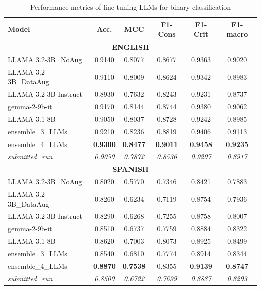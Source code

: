 \documentclass{Configuration_Files/PoliMi3i_thesis}
\begin{document}
\begin{table}[h] 
\centering
\small
\begin{tabular}{lccccc}
\hline 
\textbf{Model} & \textbf{Acc.} & \textbf{MCC} & \textbf{F1-Cons} & \textbf{F1-Crit} & \textbf{F1-macro} \\ 
\hline 
\multicolumn{6}{c}{\textbf{ENGLISH}} \\
\hline 
LLAMA 3.2-3B\_NoAug & 0.9140 & 0.8077 & 0.8677 & 0.9363 & 0.9020 \\
LLAMA 3.2-3B\_DataAug & 0.9110 & 0.8009 & 0.8624 & 0.9342 & 0.8983 \\
LLAMA 3.2-3B-Instruct & 0.8930 & 0.7632 & 0.8243 & 0.9231 & 0.8737 \\ 
gemma-2-9b-it & 0.9170 & 0.8144 & 0.8744 & 0.9380 & 0.9062 \\ 
LLAMA 3.1-8B & 0.9050 & 0.8037 & 0.8728 & 0.9242 & 0.8985 \\ 
ensemble\_3\_LLMs & 0.9210 & 0.8236 & 0.8819 & 0.9406 & 0.9113 \\
ensemble\_4\_LLMs & \textbf{0.9300} & \textbf{0.8477} & \textbf{0.9011} & \textbf{0.9458} & \textbf{0.9235} \\ 
\hline
\textit{submitted\_run} & \textit{0.9050} & \textit{0.7872} & \textit{0.8536} & \textit{0.9297} & \textit{0.8917}  \\
\hline
\multicolumn{6}{c}{\textbf{SPANISH}} \\
\hline 
LLAMA 3.2-3B\_NoAug & 0.8020 & 0.5770 & 0.7346 & 0.8421 & 0.7883 \\
LLAMA 3.2-3B\_DataAug & 0.8260 & 0.6234 & 0.7119 & 0.8754 & 0.7936 \\
LLAMA 3.2-3B-Instruct & 0.8290 & 0.6268 & 0.7255 & 0.8758 & 0.8007 \\ 
gemma-2-9b-it & 0.8510 & 0.6737 & 0.7759 & 0.8884 & 0.8322 \\ 
LLAMA 3.1-8B & 0.8620 & 0.7003 & 0.8073 & 0.8925 & 0.8499 \\ 
ensemble\_3\_LLMs & 0.8540 & 0.6810 & 0.7774 & 0.8914 & 0.8344 \\ 
ensemble\_4\_LLMs & \textbf{0.8870} & \textbf{0.7538} & 0.8355 & \textbf{0.9139} & \textbf{0.8747} \\ 
\hline
\textit{submitted\_run} & \textit{0.8500} & \textit{0.6722} & \textit{0.7699} & \textit{0.8887} & \textit{0.8293}  \\
\hline 
\end{tabular} 
\caption{Performance metrics of fine-tuning LLMs for binary classification} 
\label{tab:performance_T1_LLM_fine_tuned} 
\end{table}
\FloatBarrier
\end{document}
